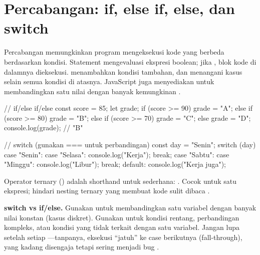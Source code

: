 \section{Percabangan: if, else if, else, dan switch}

Percabangan memungkinkan program mengeksekusi kode yang berbeda berdasarkan kondisi. Statement  mengevaluasi ekspresi boolean; jika , blok kode di dalamnya dieksekusi.  menambahkan kondisi tambahan, dan  menangani kasus selain semua kondisi di atasnya. JavaScript juga menyediakan  untuk membandingkan satu nilai dengan banyak kemungkinan \cite{jsInfo}.

\begin{webcode}[language=JavaScript, caption={if/else if/else dan switch}]
// if/else if/else
const score = 85;
let grade;
if (score >= 90) {
  grade = "A";
} else if (score >= 80) {
  grade = "B";
} else if (score >= 70) {
  grade = "C";
} else {
  grade = "D";
}
console.log(grade); // "B"

// switch (gunakan === untuk perbandingan)
const day = "Senin";
switch (day) {
  case "Senin": case "Selasa":
    console.log("Kerja"); break;
  case "Sabtu": case "Minggu":
    console.log("Libur"); break;
  default:
    console.log("Kerja juga");
}
\end{webcode}

Operator ternary () adalah shorthand untuk  sederhana: . Cocok untuk satu ekspresi; hindari nesting ternary yang membuat kode sulit dibaca \cite{mdnJsGuide}.

\begin{konsep}
\textbf{switch vs if/else.} Gunakan  untuk membandingkan satu variabel dengan banyak nilai konstan (kasus diskret). Gunakan  untuk kondisi rentang, perbandingan kompleks, atau kondisi yang tidak terkait dengan satu variabel. Jangan lupa  setelah setiap ---tanpanya, eksekusi ``jatuh'' ke case berikutnya (fall-through), yang kadang disengaja tetapi sering menjadi bug \cite{jsInfo}.
\end{konsep}

